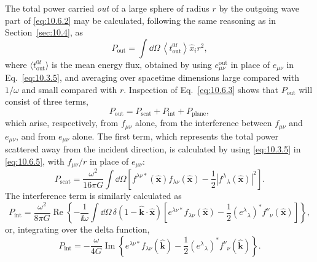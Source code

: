The total power carried \emph{out} of a large sphere of radius \(r\) by the
outgoing wave part of \eqref{eq:10.6.2} may be calculated, following the
same reasoning as in Section~\ref{sec:10.4}, as
\begin{equation}
  P_{\mathrm{out}}
  =
  \int \dd\Omega\,
  \left\langle t_{\mathrm{out}}^{0\ii}\right\rangle
  \widehat x_i r^2,
  \tag{10.6.5}\label{eq:10.6.5}
\end{equation}
where \(\langle t_{\mathrm{out}}^{0\ii}\rangle\) is the mean energy flux, obtained
by using \(e^{\mathrm{out}}_{\mu\nu}\) in place of \(e_{\mu\nu}\) in
Eq.~\eqref{eq:10.3.5}, and averaging over spacetime dimensions large
compared with \(1/\omega\) and small compared with \(r\). Inspection of
Eq.~\eqref{eq:10.6.3} shows that \(P_{\mathrm{out}}\) will consist of three
terms,
\begin{equation}
  P_{\mathrm{out}}
  =
  P_{\mathrm{scat}}+P_{\mathrm{int}}+P_{\mathrm{plane}},
  \tag{10.6.6}\label{eq:10.6.6}
\end{equation}
which arise, respectively, from \(f_{\mu\nu}\) alone, from the interference
between \(f_{\mu\nu}\) and \(e_{\mu\nu}\), and from \(e_{\mu\nu}\) alone.
The first term, which represents the total power scattered away from the
incident direction, is calculated by using \eqref{eq:10.3.5} in
\eqref{eq:10.6.5}, with \(f_{\mu\nu}/r\) in place of \(e_{\mu\nu}\):
\begin{equation}
  P_{\mathrm{scat}}
  =
  \frac{\omega^2}{16\pi G}
  \int \dd\Omega
  \left[
    f^{\lambda\nu*}(\widehat{\mathbf{x}})
    f_{\lambda\nu}(\widehat{\mathbf{x}})
    -\frac12
    \left|f^\lambda{}_\lambda(\widehat{\mathbf{x}})\right|^2
  \right].
  \tag{10.6.7}\label{eq:10.6.7}
\end{equation}
The interference term is similarly calculated as
\[
  P_{\mathrm{int}}
  =
  \frac{\omega^2}{8\pi G}
  \operatorname{Re}\!\left\{
    -\frac{1}{\ii\omega}
    \int \dd\Omega\,
    \delta(1-\widehat{\mathbf{k}}\cdot\widehat{\mathbf{x}})
    \left[
      e^{\lambda\nu*}f_{\lambda\nu}(\widehat{\mathbf{x}})
      -\frac12(e^\lambda{}_\lambda)^*
      f^\nu{}_\nu(\widehat{\mathbf{x}})
    \right]
  \right\},
\]
or, integrating over the delta function,
\begin{equation}
  P_{\mathrm{int}}
  =
  -\frac{\omega}{4G}
  \operatorname{Im}\!\left\{
    e^{\lambda\nu*}f_{\lambda\nu}(\widehat{\mathbf{k}})
    -\frac12(e^\lambda{}_\lambda)^*
    f^\nu{}_\nu(\widehat{\mathbf{k}})
  \right\}.
  \tag{10.6.8}\label{eq:10.6.8}
\end{equation}
